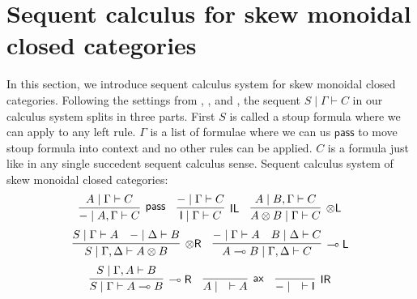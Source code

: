 \documentclass[submission,copyright,creativecommons]{eptcs}
\newcommand{\tl}{\otimes \mathsf{L}}
\newcommand{\tr}{\otimes \mathsf{R}}
\newcommand{\lright}{\multimap \mathsf{R}}
\newcommand{\lleft}{\multimap \mathsf{L}}
\newcommand{\pass}{\mathsf{pass}}
\newcommand{\unitl}{\mathsf{IL}}
\newcommand{\unitr}{\mathsf{IR}}
\newcommand{\ax}{\mathsf{ax}}
\newcommand{\ot}{\otimes}
\newcommand{\lolli}{\multimap}
\newcommand{\I}{\mathsf{I}}
\begin{document}
\section{Sequent calculus for skew monoidal closed categories}
In this section, we introduce sequent calculus system for skew monoidal closed categories.
Following the settings from \cite{uustalu:sequent:2018}, \cite{uustalu:deductive:nodate}, and \cite{uustalu:proof:nodate}, the sequent $S \mid \Gamma \vdash C$ in our calculus system splits in three parts.
First $S$ is called a stoup formula where we can apply to any left rule.
$\Gamma$ is a list of formulae where we can us $\pass$ to move stoup formula into context and no other rules can be applied.
$C$ is a formula just like in any single succedent sequent calculus sense.
Sequent calculus system of skew monoidal closed categories:
\begin{displaymath}
  \infer[\pass]{- \mid A , \Gamma \vdash C}{A \mid \Gamma \vdash C}
  \quad
  \infer[\unitl]{\I \mid \Gamma \vdash C}{- \mid \Gamma \vdash C}
  \quad
  \infer[\tl]{A \ot B \mid \Gamma \vdash C}{A \mid B , \Gamma \vdash C}
\end{displaymath}
\begin{displaymath}
  \infer[\tr]{S \mid \Gamma , \Delta \vdash A \ot B}{
    S \mid \Gamma \vdash A
    &
    - \mid \Delta \vdash B
  }
  \quad
  \infer[\lleft]{A \lolli B \mid \Gamma , \Delta \vdash C}{
    - \mid \Gamma \vdash A
    &
    B \mid \Delta \vdash C
    }
\end{displaymath}
\begin{displaymath}
  \infer[\lright]{S \mid \Gamma \vdash A \lolli B}{S \mid \Gamma , A \vdash B}
  \quad
  \infer[\ax]{A \mid \quad \vdash A}{}
  \quad
  \infer[\unitr]{- \mid \quad \vdash \I}{}
\end{displaymath}
\end{document}
